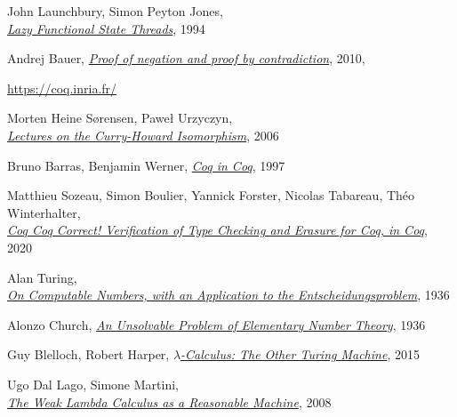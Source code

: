 \documentclass[declaration,mgr,english,shortabstract]{iithesis}
\begin{document}
\begin{thebibliography}{1}
    John Launchbury, Simon Peyton Jones, \\
    \href{https://www.microsoft.com/en-us/research/wp-content/uploads/1994/06/lazy-functional-state-threads.pdf}{\textit{Lazy Functional State Threads}},
    1994

    Andrej Bauer,
    \href{http://math.andrej.com/2010/03/29/proof-of-negation-and-proof-by-contradiction/}{\textit{Proof of negation and proof by contradiction}},
    2010, \\

    \url{https://coq.inria.fr/}

    Morten Heine Sørensen, Paweł Urzyczyn, \\
    \href{http://disi.unitn.it/~bernardi/RSISE11/Papers/curry-howard.pdf}{\textit{Lectures on the Curry-Howard Isomorphism}},
    2006

    Bruno Barras, Benjamin Werner,
    \href{http://www.lix.polytechnique.fr/Labo/Bruno.Barras/publi/coqincoq.pdf}{\textit{Coq in Coq}},
    1997

    Matthieu Sozeau, Simon Boulier, Yannick Forster, Nicolas Tabareau, Théo Winterhalter, \\
    \href{https://www.irif.fr/~sozeau/research/publications/drafts/Coq_Coq_Correct.pdf}{\textit{Coq Coq Correct! Verification of Type Checking and Erasure for Coq, in Coq}},
    2020

    Alan Turing, \\
    \href{https://www.cs.virginia.edu/~robins/Turing_Paper_1936.pdf}{\textit{On Computable Numbers, with an Application to the Entscheidungsproblem}},
    1936

    Alonzo Church,
    \href{https://www.ics.uci.edu/~lopes/teaching/inf212W12/readings/church.pdf}{\textit{An Unsolvable Problem of Elementary Number Theory}},
    1936

    Guy Blelloch, Robert Harper,
    \href{https://www.cs.cmu.edu/~rwh/papers/lctotm/cs50.pdf}{\textit{$\lambda$-Calculus: The Other Turing Machine}},
    2015

    Ugo Dal Lago, Simone Martini, \\
    \href{https://www.di.unito.it/~deligu/CDR60_TCS/Martini.pdf}{\textit{The Weak Lambda Calculus as a Reasonable Machine}},
    2008


\end{thebibliography}
\end{document}

